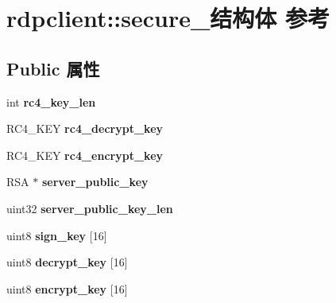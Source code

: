 \hypertarget{structrdpclient_1_1secure__}{}\section{rdpclient\+:\+:secure\+\_\+结构体 参考}
\label{structrdpclient_1_1secure__}
\subsection*{Public 属性}
\begin{DoxyCompactItemize}
\item 
\mbox{\label{structrdpclient_1_1secure___a1e08d369a4b6230a66abc65504310613}} 
int {\bfseries rc4\+\_\+key\+\_\+len}
\item 
\mbox{\label{structrdpclient_1_1secure___aae2c980344eb3301329c6a3499996a6e}} 
R\+C4\+\_\+\+K\+EY {\bfseries rc4\+\_\+decrypt\+\_\+key}
\item 
\mbox{\label{structrdpclient_1_1secure___af72fa7f8921221f4d58a6b627019a82a}} 
R\+C4\+\_\+\+K\+EY {\bfseries rc4\+\_\+encrypt\+\_\+key}
\item 
\mbox{\label{structrdpclient_1_1secure___a1812a744d2981408492f12df9a375962}} 
R\+SA $\ast$ {\bfseries server\+\_\+public\+\_\+key}
\item 
\mbox{\label{structrdpclient_1_1secure___a0eee6f9564ebd4f79cdabaf0839d7c6b}} 
uint32 {\bfseries server\+\_\+public\+\_\+key\+\_\+len}
\item 
\mbox{\label{structrdpclient_1_1secure___a3d2096a7bca47345edee687d8ef1a864}} 
uint8 {\bfseries sign\+\_\+key} \mbox{[}16\mbox{]}
\item 
\mbox{\label{structrdpclient_1_1secure___a3f6a7f31f238c94a65a411c4a5eecef3}} 
uint8 {\bfseries decrypt\+\_\+key} \mbox{[}16\mbox{]}
\item 
\mbox{\label{structrdpclient_1_1secure___a9078f47b64648f061533394ffce3c3de}} 
uint8 {\bfseries encrypt\+\_\+key} \mbox{[}16\mbox{]}

\end{DoxyCompactItemize}
